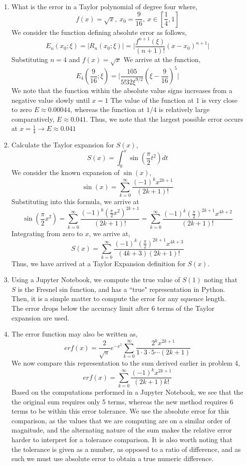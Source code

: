 \documentclass[letterpaper,10pt]{article}
\begin{document}
\begin{enumerate}
\begin{proof}
Thus, we see that there may only be one zero of this function. So, we have shown that there is only one zero of $f(x)=x^3+2x+k$ regardless of your choice in $k$.
\end{proof}
\item What is the error in a Taylor polynomial of degree four where,
\[f(x)=\sqrt{x},\ x_0=\frac{9}{16},\ x\in[\frac{1}{4},1]\]
We consider the function defining absolute error as follows,
\[E_n(x_0;\xi)=|R_n(x_0;\xi)|=\bigg|\frac{f^{n+1}(\xi)}{(n+1)!}(x-x_0)^{n+1}\bigg|\]
Substituting $n=4$ and $f(x)=\sqrt{x}$ We arrive at the function,
\[E_4(\frac{9}{16};\xi)=\bigg|\frac{105}{5!32\xi^{9/2}}(\xi-\frac{9}{16})^5\bigg|\]
We note that the function within the absolute value signs increases from a negative value slowly until $x=1$
The value of the function at $1$ is very close to zero $E\approx 0.00044$, whereas the function at $1/4$ is relatively large comparatively, $E\approx 0.041$. Thus, we note that the largest possible error occurs at $x=\frac{1}{4}\to E\approx 0.041$
\item Calculate the Taylor expansion for $S(x)$,
\[S(x)=\int_0^x\sin(\frac{\pi}{2}t^2)dt\]
We consider the known expansion of $\sin(x)$,
\[\sin(x)=\sum_{k=0}^{\infty}\frac{(-1)^kx^{2k+1}}{(2k+1)!}\]
Substituting into this formula, we arrive at
\[\sin(\frac{\pi}{2}x^2)=\sum_{k=0}^{\infty}\frac{(-1)^k(\frac{\pi}{2}x^2)^{2k+1}}{(2k+1)!}=\sum_{k=0}^{\infty}\frac{(-1)^k(\frac{\pi}{2})^{2k+1}x^{4k+2}}{(2k+1)!}\]
Integrating from zero to $x$, we arrive at,
\[S(x)=\sum_{k=0}^{\infty}\frac{(-1)^k(\frac{\pi}{2})^{2k+1}x^{4k+3}}{(4k+3)(2k+1)!}\]
Thus, we have arrived at a Taylor Expansion definition for $S(x)$.
\item Using a Jupyter Notebook, we compute the true value of $S(1)$ noting that $S$ is the Fresnel sin function, and has a ``true" representation in Python. Then, it is a simple matter to compute the error for any squence length.\\
The error drops below the accuracy limit after 6 terms of the Taylor expansion are used.
\item The error function may also be written as,
\[erf(x)=\frac{2}{\sqrt{\pi}}e^{-x^2}\sum_{k=0}^{\infty}\frac{2^kx^{2k+1}}{1\cdot 3\cdot 5\cdots(2k+1)}\]
We now compare this representation to the sum derived earlier in problem 4,
\[erf(x)=\sum_{k=0}^{\infty}\frac{(-1)^kx^{2k+1}}{(2k+1)k!}\]
Based on the computations performed in a Jupyter Notebook, we see that the the original sum requires only 5 terms, whereas the new method requires 6 terms to be within this error tolerance. We use the absolute error for this comparison, as the values that we are computing are on a similar order of magnitude, and the alternating nature of the sum makes the relative error harder to interpret for a tolerance comparison. It is also worth noting that the tolerance is given as a number, as opposed to a ratio of difference, and as such we must use absolute error to obtain a true numeric difference.

\end{enumerate}
\end{document}
